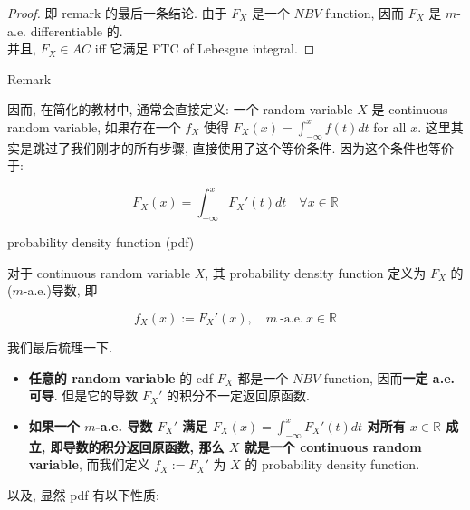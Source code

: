 \documentclass{qlnotes-export}
\begin{document}
\begin{proof}

即 remark 的最后一条结论. 由于 \(F_{X}\) 是一个 \(NBV\) function, 因而 \(F_{X}\) 是 \(m\)-a.e. differentiable 的.\\
并且, \(F_{X} \in AC\) iff 它满足 FTC of Lebesgue integral.

\end{proof}

\begin{qlremark}{Remark}

因而, 在简化的教材中, 通常会直接定义: 一个 random variable \(X\) 是 continuous random variable, 如果存在一个 \(f_{X}\) 使得 \(F_{X}(x) = \int_{- \infty}^{x}f(t) dt\) for all \(x\). 这里其实是跳过了我们刚才的所有步骤, 直接使用了这个等价条件. 因为这个条件也等价于:

\[F_{X}(x) = \int_{- \infty}^{x}F_{X}'(t) dt\quad\forall x \in {\mathbb{R}}\]

\end{qlremark}

\begin{definition}{probability density function (pdf)}\label{def-02-random-variables-probability-density-function-pdf}

对于 continuous random variable \(X\), 其 probability density function 定义为 \(F_{X}\) 的 (\(m\)-a.e.)导数, 即

\[f_{X}(x) := F_{X}'(x),\quad m\ \text{-a.e.}\ x \in {\mathbb{R}}\]

\end{definition}

我们最后梳理一下.

\begin{itemize}
\item
  \textbf{任意的 random variable} 的 cdf \(F_{X}\) 都是一个 \(NBV\) function, 因而\textbf{一定 a.e. 可导}. 但是它的导数 \(F_{X}'\) 的积分不一定返回原函数.
\item
  \textbf{如果一个 \(m\)-a.e. 导数 \(F_{X}'\) 满足 \(F_{X}(x) = \int_{- \infty}^{x}F_{X}'(t) dt\) 对所有 \(x \in {\mathbb{R}}\) 成立, 即导数的积分返回原函数, 那么 \(X\) 就是一个 continuous random variable}, 而我们定义 \(f_{X} := F_{X}'\) 为 \(X\) 的 probability density function.
\end{itemize}

以及, 显然 pdf 有以下性质:
\end{document}
